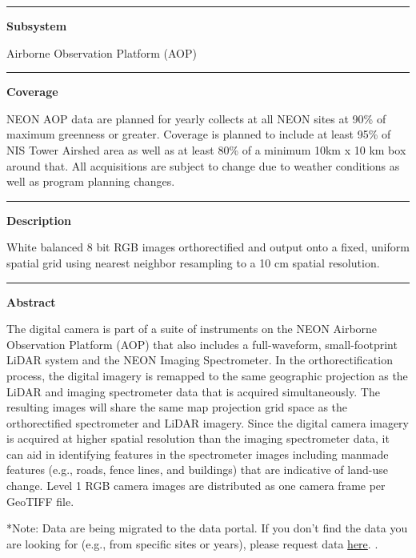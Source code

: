 \documentclass[]{article}
\begin{document}
\begin{center}\rule{0.5\linewidth}{\linethickness}\end{center}

\textbf{Subsystem}

Airborne Observation Platform (AOP)

\begin{center}\rule{0.5\linewidth}{\linethickness}\end{center}

\textbf{Coverage}

NEON AOP data are planned for yearly collects at all NEON sites at 90\%
of maximum greenness or greater. Coverage is planned to include at least
95\% of NIS Tower Airshed area as well as at least 80\% of a minimum
10km x 10 km box around that. All acquisitions are subject to change due
to weather conditions as well as program planning changes.

\begin{center}\rule{0.5\linewidth}{\linethickness}\end{center}

\textbf{Description}

White balanced 8 bit RGB images orthorectified and output onto a fixed,
uniform spatial grid using nearest neighbor resampling to a 10 cm
spatial resolution.

\begin{center}\rule{0.5\linewidth}{\linethickness}\end{center}

\textbf{Abstract}

The digital camera is part of a suite of instruments on the NEON
Airborne Observation Platform (AOP) that also includes a full-waveform,
small-footprint LiDAR system and the NEON Imaging Spectrometer. In the
orthorectification process, the digital imagery is remapped to the same
geographic projection as the LiDAR and imaging spectrometer data that is
acquired simultaneously. The resulting images will share the same map
projection grid space as the orthorectified spectrometer and LiDAR
imagery. Since the digital camera imagery is acquired at higher spatial
resolution than the imaging spectrometer data, it can aid in identifying
features in the spectrometer images including manmade features (e.g.,
roads, fence lines, and buildings) that are indicative of land-use
change. Level 1 RGB camera images are distributed as one camera frame
per GeoTIFF file.

*Note: Data are being migrated to the data portal. If you don't find the
data you are looking for (e.g., from specific sites or years), please
request data
\href{http://www.neonscience.org/request-airborne-data}{here}. \newpage
.
\end{document}
